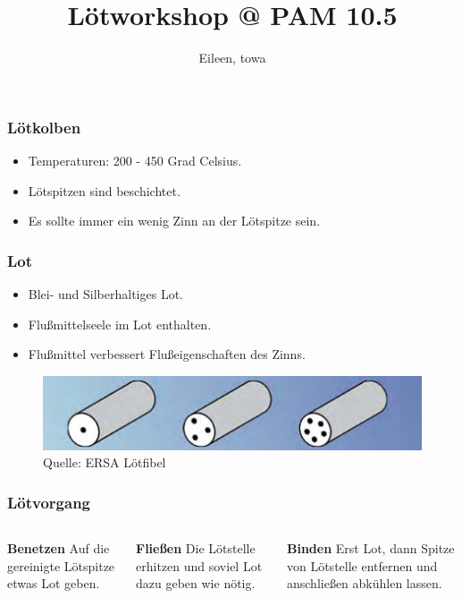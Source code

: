 \documentclass[10pt]{beamer}
\title[soldering-workshop] %
{Lötworkshop @ PAM 10.5}
\author{Eileen, towa}
\begin{document}
    \maketitle

    \begin{frame}
        \frametitle{Lötkolben}
        \begin{itemize}
            \item{Temperaturen: 200 - 450 Grad Celsius.}
            \item{Lötspitzen sind beschichtet.}
            \item{Es sollte immer ein wenig Zinn an der Lötspitze sein.}
        \end{itemize}
    \end{frame}

    \begin{frame}
        \frametitle{Lot}
        \begin{itemize}
            \item{Blei- und Silberhaltiges Lot.}
            \item{Flußmittelseele im Lot enthalten.}
            \item{Flußmittel verbessert Flußeigenschaften des Zinns.}
        \end{itemize}
        \begin{figure}[hbtp]
            \centering
            \includegraphics[width=\linewidth]{images/lotseele.png}
            \caption{Quelle: ERSA Lötfibel}
        \end{figure}
    \end{frame}

    \begin{frame}
        \frametitle{Lötvorgang}
            \begin{columns}[T] %
                \begin{column}{.33\textwidth}
                    \textbf{Benetzen} \newline
                    Auf die gereinigte Lötspitze etwas Lot geben.
                \end{column}%
                \hfill%
                \begin{column}{.33\textwidth}
                    \textbf{Fließen} \newline
                    Die Lötstelle erhitzen und soviel Lot dazu geben wie nötig.
                \end{column}%
                \begin{column}{.33\textwidth}
                    \textbf{Binden} \newline
                    Erst Lot, dann Spitze von Lötstelle entfernen und anschließen abkühlen lassen.
                \end{column}%
                \hfill%
            \end{columns}
    \end{frame}
\end{document}

